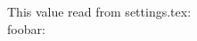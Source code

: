 \documentclass[a4paper,twoside]{book}
\begin{document}
{\mktsFontDejavuserif\mktsSampletexten}\par
{\mktsFontCwtexqkaimedium\mktsSampletextzh}\par
{\mktsFontSunexta{}\mktsSampletextzh}\par
This value read from settings.tex: \\foobar: \foobar\par
\end{document}
